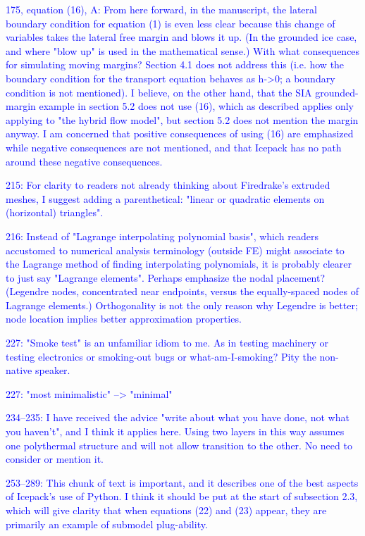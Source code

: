 \documentclass{article}
\theoremstyle{definition}
\theoremstyle{plain}
\begin{document}
\textcolor{blue}{175, equation (16), A:  From here forward, in the manuscript, the lateral boundary condition for equation (1) is even less clear because this change of variables takes the lateral free margin and blows it up.  (In the grounded ice case, and where "blow up" is used in the mathematical sense.)  With what consequences for simulating moving margins?  Section 4.1 does not address this (i.e. how the boundary condition for the transport equation behaves as h->0; a boundary condition is not mentioned).  I believe, on the other hand, that the SIA grounded-margin example in section 5.2 does not use (16), which as described applies only applying to "the hybrid flow model", but section 5.2 does not mention the margin anyway.  I am concerned that positive consequences of using (16) are emphasized while negative consequences are not mentioned, and that Icepack has no path around these negative consequences.}

\textcolor{blue}{215:  For clarity to readers not already thinking about Firedrake's extruded meshes, I suggest adding a parenthetical: "linear or quadratic elements on (horizontal) triangles".}

\textcolor{blue}{216:  Instead of "Lagrange interpolating polynomial basis", which readers accustomed to numerical analysis terminology (outside FE) might associate to the Lagrange method of finding interpolating polynomials, it is probably clearer to just say "Lagrange elements".  Perhaps emphasize the nodal placement?  (Legendre nodes, concentrated near endpoints, versus the equally-spaced nodes of Lagrange elements.)  Orthogonality is not the only reason why Legendre is better; node location implies better approximation properties.}

\textcolor{blue}{227:  "Smoke test" is an unfamiliar idiom to me.  As in testing machinery or testing electronics or smoking-out bugs or what-am-I-smoking?  Pity the non-native speaker.}

\textcolor{blue}{227:  "most minimalistic" --> "minimal"}

\textcolor{blue}{234--235:  I have received the advice "write about what you have done, not what you haven't", and I think it applies here.  Using two layers in this way assumes one polythermal structure and will not allow transition to the other.  No need to consider or mention it.}

\textcolor{blue}{253--289:  This chunk of text is important, and it describes one of the best aspects of Icepack's use of Python.  I think it should be put at the start of subsection 2.3, which will give clarity that when equations (22) and (23) appear, they are primarily an example of submodel plug-ability.}
\end{document}
